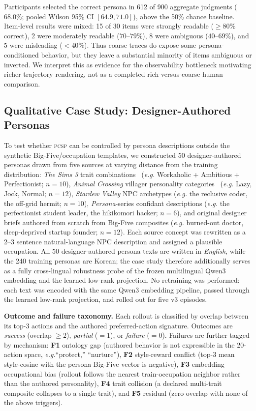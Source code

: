 \documentclass[conference]{IEEEtran}
\newcommand{\PCSP}{\textsc{pcsp}\xspace}
\newcommand{\eg}{\textit{e.g.}\xspace}
\begin{document}
Participants selected the correct persona in 612 of 900 aggregate judgments
($68.0\%$; pooled Wilson 95\% CI $[64.9, 71.0]$), above the 50\% chance
baseline. Item-level results were mixed: 15 of 30 items were strongly readable
($\geq 80\%$ correct), 2 were moderately readable ($70$--$79\%$), 8 were
ambiguous ($40$--$69\%$), and 5 were misleading ($<40\%$). Thus coarse traces
do expose some persona-conditioned behavior, but they leave a substantial
minority of items ambiguous or inverted. We interpret this as evidence for the
observability bottleneck motivating richer trajectory rendering, not as a
completed rich-versus-coarse human comparison.

\subsection{Qualitative Case Study: Designer-Authored Personas}
\label{sec:qualcase}

To test whether \PCSP can be controlled by persona descriptions outside the
synthetic Big-Five/occupation templates, we constructed 50 designer-authored
personas drawn from five sources at varying distance from the training
distribution: \textit{The Sims 3} trait combinations~\cite{sims3traits}
(\eg Workaholic + Ambitious + Perfectionist; $n\!=\!10$),
\textit{Animal Crossing} villager personality
categories~\cite{nookipediaVillager} (\eg Lazy, Jock, Normal; $n\!=\!12$),
\textit{Stardew Valley} NPC archetypes (\eg the reclusive coder, the
off-grid hermit; $n\!=\!10$), \textit{Persona}-series confidant descriptions
(\eg the perfectionist student leader, the hikikomori hacker; $n\!=\!6$),
and original designer briefs authored from scratch from Big-Five composites
(\eg burned-out doctor, sleep-deprived startup founder; $n\!=\!12$). Each
source concept was rewritten as a 2--3 sentence natural-language NPC
description and assigned a plausible occupation.
All 50 designer-authored persona texts are written in \emph{English}, while
the 240 training personas are Korean; the case study therefore additionally
serves as a fully cross-lingual robustness probe of the frozen multilingual
Qwen3 embedding and the learned low-rank projection. No retraining was
performed: each text was encoded with the same Qwen3 embedding pipeline,
passed through the learned low-rank projection, and rolled out for five v3
episodes.

\textbf{Outcome and failure taxonomy.}
Each rollout is classified by overlap between its top-3 actions and the
authored preferred-action signature. Outcomes are \emph{success} (overlap
$\geq\!2$), \emph{partial} ($=\!1$), or \emph{failure} ($=\!0$). Failures are
further tagged by mechanism: \textbf{F1} ontology gap (authored behavior is
not expressible in the 20-action space, \eg ``protect,'' ``nurture''),
\textbf{F2} style-reward conflict (top-3 mean style-cosine with the persona
Big-Five vector is negative), \textbf{F3} embedding occupational bias (rollout
follows the nearest train-occupation neighbor rather than the authored
personality), \textbf{F4} trait collision (a declared multi-trait composite
collapses to a single trait), and \textbf{F5} residual (zero overlap with
none of the above triggers).
\end{document}

